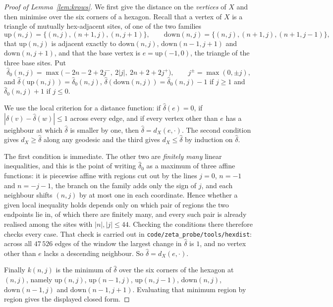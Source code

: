\documentclass[11pt]{article}
\theoremstyle{definition}
\theoremstyle{remark}
\begin{document}
\begin{proof}[Proof of Lemma~\ref{lem:krows}]
We first give the distance on the \emph{vertices} of $X$ and then minimise over the six corners
of a hexagon. Recall that a vertex of $X$ is a triangle of mutually hex-adjacent sites, of one
of the two families
\[
  \mathrm{up}(n,j)=\{(n,j),(n{+}1,j),(n,j{+}1)\},\qquad
  \mathrm{down}(n,j)=\{(n,j),(n{+}1,j),(n{+}1,j{-}1)\},
\]
that $\mathrm{up}(n,j)$ is adjacent exactly to $\mathrm{down}(n,j)$, $\mathrm{down}(n-1,j+1)$
and $\mathrm{down}(n,j+1)$, and that the base vertex is $e=\mathrm{up}(-1,0)$, the triangle of
the three base sites. Put
\[
  \widehat\delta_0(n,j)=\max\bigl(-2n-2+2j^-,\ 2|j|,\ 2n+2+2j^+\bigr),\qquad
  j^{\pm}=\max(0,\pm j),
\]
and $\widehat\delta(\mathrm{up}(n,j))=\widehat\delta_0(n,j)$,
$\widehat\delta(\mathrm{down}(n,j))=\widehat\delta_0(n,j)-1$ if $j\ge1$ and
$\widehat\delta_0(n,j)+1$ if $j\le0$.

We use the local criterion for a distance function: if $\widehat\delta(e)=0$, if
$|\widehat\delta(v)-\widehat\delta(w)|\le1$ across every edge, and if every vertex other than
$e$ has a neighbour at which $\widehat\delta$ is smaller by one, then
$\widehat\delta=d_X(e,\cdot)$. The second condition gives $d_X\ge\widehat\delta$ along any
geodesic and the third gives $d_X\le\widehat\delta$ by induction on $\widehat\delta$.

The first condition is immediate. The other two are \emph{finitely many} linear inequalities,
and this is the point of writing $\widehat\delta_0$ as a maximum of three affine functions: it
is piecewise affine with regions cut out by the lines $j=0$, $n=-1$ and $n=-j-1$, the branch on
the family adds only the sign of $j$, and each neighbour shifts $(n,j)$ by at most one in each
coordinate. Hence whether a given local inequality holds depends only on which pair of regions
the two endpoints lie in, of which there are finitely many, and every such pair is already
realised among the sites with $|n|,|j|\le44$. Checking the conditions there therefore checks
every case. That check is carried out in
\texttt{code/zeta\_probe/tools/hexdist}: across all $47\,526$ edges of the window the largest
change in $\widehat\delta$ is $1$, and no vertex other than $e$ lacks a descending neighbour.
So $\widehat\delta=d_X(e,\cdot)$.

Finally $k(n,j)$ is the minimum of $\widehat\delta$ over the six corners of the hexagon at
$(n,j)$, namely $\mathrm{up}(n,j)$, $\mathrm{up}(n-1,j)$, $\mathrm{up}(n,j-1)$,
$\mathrm{down}(n,j)$, $\mathrm{down}(n-1,j)$ and $\mathrm{down}(n-1,j+1)$. Evaluating that
minimum region by region gives the displayed closed form.
\end{proof}
\end{document}
